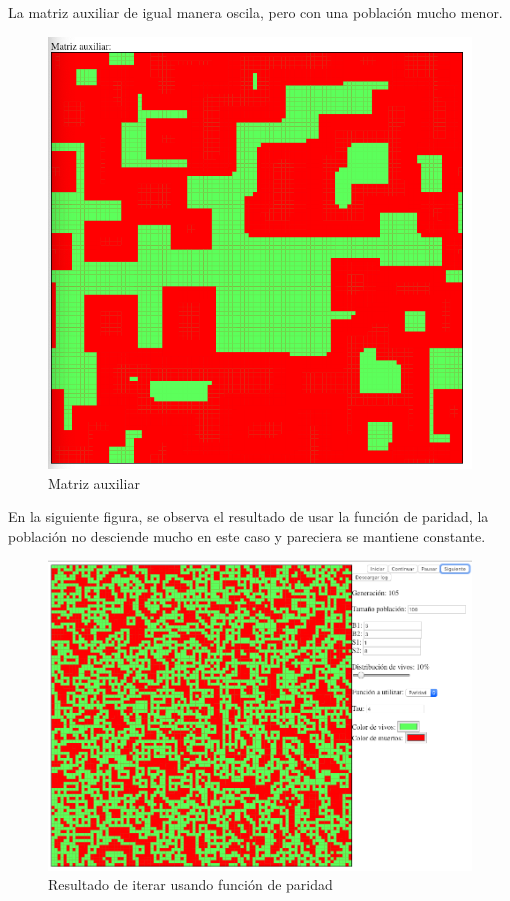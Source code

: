 	La matriz auxiliar de igual manera oscila, pero con una población mucho menor.
	\begin{figure}[H]
		\begin{center}
			\includegraphics[scale=.3]{GOLM/img/regla3318-2-1.png}
			\caption{Matriz auxiliar}
			\label{fig:golm26}
		\end{center}
	\end{figure}

	En la siguiente figura, se observa el resultado de usar la función de paridad, la población no desciende mucho en este caso y pareciera se mantiene constante.
	\begin{figure}[H]
		\begin{center}
			\includegraphics[scale=.3]{GOLM/img/regla3318-3.png}
			\caption{Resultado de iterar usando función de paridad}
			\label{fig:golm27}
		\end{center}
	\end{figure}

